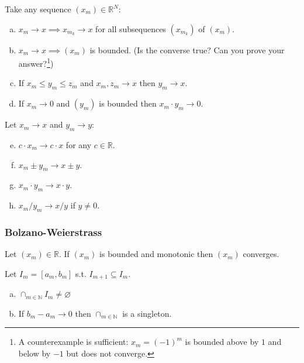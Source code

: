 \documentclass{article}
\begin{document}
\begin{theorem}
  Take any sequence $(x_m) \in \mathbb{R}^N$:
  \begin{enumerate}[a)]
    \item $x_m \to x \implies x_{m_k} \to x$ for all subsequences $(x_{m_k})$ of $(x_m)$.

    \item $x_m \to x \implies (x_m)$ is bounded. (Is the converse true? Can you prove your answer?\footnote{A counterexample is sufficient: $x_m = (-1)^m$ is bounded above by $1$ and below by $-1$ but does not converge.})

    \item If $x_m \le y_m \le z_m$ and $x_m, z_m \to x$ then $y_m \to x$.

    \item If $x_m \to 0$ and $(y_m)$ is bounded then $x_m \cdot y_m \to 0$.
  \end{enumerate}

  Let $x_m \to x$ and $y_m \to y$:
  \begin{enumerate}[a)]\setcounter{enumi}{4}
    \item $c \cdot x_m \to c \cdot x$ for any $c \in \mathbb{R}$.

    \item $x_m \pm y_m \to x \pm y$.

    \item $x_m \cdot y_m \to x \cdot y$.

    \item $x_m / y_m \to x / y$ if $y \ne 0$.
  \end{enumerate}
\end{theorem}


\subsubsection{Bolzano-Weierstrass}
\label{ssub:bolzano_weierstrass}

\begin{theorem}\label{thm:lecture2_bounded_mono_converge}
  Let $(x_m) \in \mathbb{R}$. If $(x_m)$ is bounded and monotonic then $(x_m)$ converges.
\end{theorem}

\begin{theorem}\label{thm:lecture2_nested_interval}
  Let $I_m = [a_m,  b_m]$ s.t. $I_{m + 1} \subseteq I_m$.
  \begin{enumerate}[a)]
    \item $\cap_{m \in \mathbb{N}} I_m \ne \varnothing$
    \item If $b_m - a_m \to 0$ then $\cap_{m \in \mathbb{N}}$ is  a singleton.
  \end{enumerate}
\end{theorem}
\end{document}
